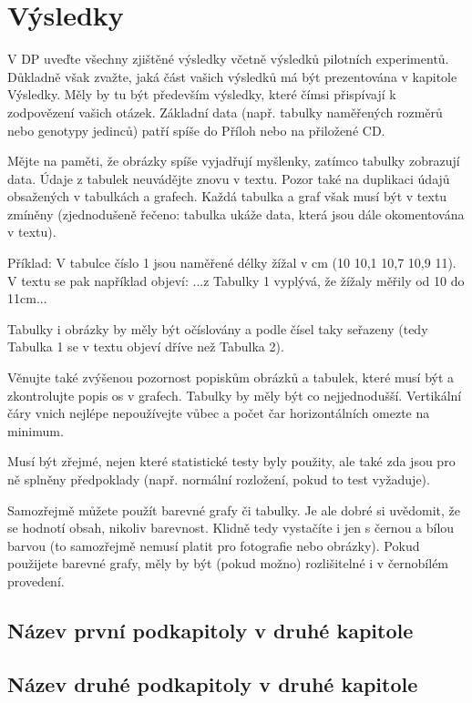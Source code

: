 \chapter{Výsledky}

V DP uveďte všechny zjištěné výsledky včetně výsledků pilotních experimentů. Důkladně však zvažte, jaká část vašich výsledků má být prezentována v kapitole Výsledky. Měly by tu být především výsledky, které čímsi přispívají k zodpovězení vašich otázek. Základní data (např. tabulky naměřených rozměrů nebo genotypy jedinců)  patří spíše do Příloh nebo na přiložené CD. 

Mějte na paměti, že obrázky spíše vyjadřují myšlenky, zatímco tabulky zobrazují data. Údaje z tabulek neuvádějte znovu v textu. Pozor také na duplikaci údajů obsažených v tabulkách a grafech. Každá tabulka a graf však musí být v textu zmíněny (zjednodušeně řečeno: tabulka ukáže data, která jsou dále okomentována v textu).

Příklad: V tabulce číslo 1 jsou naměřené délky žížal v cm (10  10,1  10,7  10,9  11).  V textu se pak například objeví: ...z Tabulky 1 vyplývá, že žížaly měřily od 10 do 11cm...

Tabulky i obrázky by měly být očíslovány a podle čísel taky seřazeny (tedy Tabulka 1 se v textu objeví dříve než Tabulka 2).

Věnujte také zvýšenou pozornost popiskům obrázků a tabulek, které musí být   a zkontrolujte popis os v grafech. Tabulky by měly být co nejjednodušší. Vertikální čáry vnich nejlépe nepoužívejte vůbec a počet čar horizontálních omezte na minimum.

Musí být zřejmé, nejen které statistické testy byly použity, ale také zda jsou pro ně splněny předpoklady (např. normální rozložení, pokud to test vyžaduje). 

Samozřejmě můžete použít barevné grafy či tabulky. Je ale dobré si uvědomit, že se hodnotí obsah, nikoliv barevnost. Klidně tedy vystačíte i jen s černou a bílou barvou (to samozřejmě nemusí platit pro fotografie nebo obrázky). Pokud použijete barevné grafy, měly by být (pokud možno) rozlišitelné i v černobílém provedení.

\section{Název první podkapitoly v druhé kapitole}

\section{Název druhé podkapitoly v druhé kapitole}

